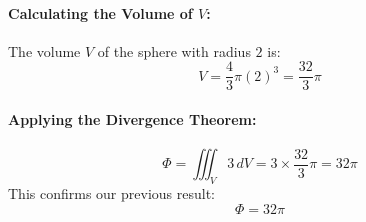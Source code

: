 \documentclass[11pt]{article}
\begin{document}
\paragraph{Calculating the Volume of \( V \):}
The volume \( V \) of the sphere with radius \( 2 \) is:
\[
V = \frac{4}{3} \pi (2)^3 = \frac{32}{3} \pi
\]

\paragraph{Applying the Divergence Theorem:}
\[
\Phi = \iiint_{V} 3 \, dV = 3 \times \frac{32}{3} \pi = 32\pi
\]
This confirms our previous result:
\[
\boxed{ \Phi = 32\pi }
\]




\newpage
\end{document}
